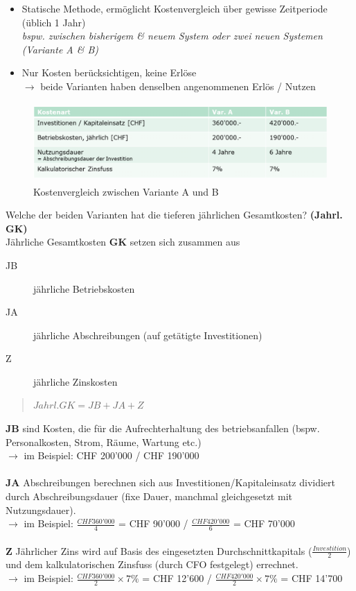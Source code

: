 \documentclass[a4paper]{article}
\begin{document}
			\begin{itemize}
				\item Statische Methode, ermöglicht Kostenvergleich über gewisse Zeitperiode (üblich 1 Jahr)\\
					\textit{bspw. zwischen bisherigem \& neuem System oder zwei neuen Systemen (Variante A \& B)}
				\item Nur Kosten berücksichtigen, keine Erlöse\\ 
				$\rightarrow$ beide Varianten haben denselben angenommenen Erlös / Nutzen
			\end{itemize}
		
			\begin{figure}[!htb]
				\centering
				\includegraphics[height=3cm]{img/pm/kosten.png}
				\caption{Kostenvergleich zwischen Variante A und B}
				\label{fig:pm_kosten}
			\end{figure}
			\noindent
			Welche der beiden Varianten hat die tieferen jährlichen Gesamtkosten? \textbf{(Jahrl. GK)}\\
			Jährliche Gesamtkosten \textbf{GK} setzen sich zusammen aus
			\begin{description}
				\item[JB] jährliche Betriebskosten
				\item[JA] jährliche Abschreibungen (auf getätigte Investitionen)
				\item[Z] jährliche Zinskosten
			\end{description}
		
			\begin{quote}
				$Jahrl. GK = JB + JA + Z$
			\end{quote}
			
			\textbf{JB} sind Kosten, die für die Aufrechterhaltung des betriebsanfallen (bspw. Personalkosten, Strom, Räume, Wartung etc.)\\
			$\rightarrow$ im Beispiel: CHF 200'000 / CHF 190'000\\
			\\
			\textbf{JA} Abschreibungen berechnen sich aus Investitionen/Kapitaleinsatz dividiert durch Abschreibungsdauer (fixe Dauer, manchmal gleichgesetzt mit Nutzungsdauer).\\
			$\rightarrow$ im Beispiel: $\frac{CHF 360'000}{4}$ = CHF 90'000 / $\frac{CHF 420'000}{6}$ = CHF 70'000\\
			\\
			\textbf{Z} Jährlicher Zins wird auf Basis des eingesetzten Durchschnittkapitals ($\frac{Investition}{2}$) und dem kalkulatorischen Zinsfuss (durch CFO festgelegt) errechnet.\\
			$\rightarrow$ im Beispiel: $\frac{CHF 360'000}{2} \times 7 \%$ = CHF 12'600 / $\frac{CHF 420'000}{2} \times 7 \%$ = CHF 14'700
			
\end{document}
